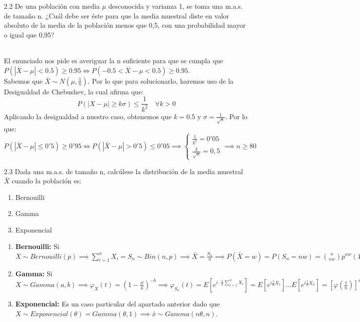 \begin{problem}{2.2}
	De una población con media $\mu$ desconocida y varianza 1, se toma una m.a.s. de tamaño n. ¿Cuál debe ser éste para que la media muestral diste en valor absoluto de la media de la población menos que 0,5, con una probabilidad mayor o igual que 0,95?
\end{problem}
\begin{sol}
	\\El enunciado nos pide es averiguar la n suficiente para que se cumpla que $P(|\bar{X}-\mu|<0.5)\geq 0.95 \iff P( -0.5 < \bar{X} - \mu < 0.5) \geq 0.95$.\\
	Sabemos que $\bar{X} \sim N(\mu, \frac{1}{n})$. Por lo que 
	para solucionarlo, haremos uso de la Desigualdad de Chebushev, la cual afirma que: $$ P(|X - \mu| \geq k\sigma) \leq \frac{1}{k^2} \quad \forall k > 0$$
	Aplicando la desigualdad a nuestro caso, obtenemos que $k = 0.5$ y $\sigma = \frac{1}{\sqrt{n}}$. Por lo que:
	$$P(|\bar{X} - \mu| \leq 0'5) \geq 0'95 \iff P(|\bar{X} - \mu| > 0'5) \leq 0'05 \implies \begin{cases} \frac{1}{k^2} = 0'05 \\ \frac{k}{\sqrt{n}} = 0,5 \end{cases} \implies n \geq 80$$
\end{sol}
\begin{problem}{2.3}
	Dada una m.a.s. de tamaño n, calcúlese la distribución de la media muestral $\bar{X}$ cuando la población es: 
	\begin{enumerate}
		\item Bernouilli
		\item Gamma
		\item Exponencial
	\end{enumerate}	
\end{problem}
\begin{sol}
	\begin{enumerate}
		\item \textbf{Bernouilli:} Si $X \sim Bernouilli(p) \implies \sum_{i = 1}^{n}X_i = S_n \sim Bin(n, p) \implies \bar{X} = \frac{S_n}{n} \implies P(\bar{X} = w) = P(S_n = nw) = \binom{n}{nw}p^{nw}(1-p)^{n(1-w)}$
		\item \textbf{Gamma:} Si $X \sim Gamma(a, b) \implies \varphi_{X}(t) = (1 - \frac{it}{a})^{-b} \implies \varphi_{S_n}(t) = E[e^{i \cdot \frac{t}{n}\sum_{i = 1}^{n}X_i}] = E[e^{i\frac{t}{n}X_1}] \ldots E[e^{i\frac{t}{n}X_n}] = \left[\varphi(\frac{t}{n})\right]^n = (1- \frac{it}{an})^{-nb} \implies \bar{X} \sim Gamma(na,nb)$
		\item \textbf{Exponencial:} Es un caso particular del apartado anterior dado que $X \sim Exponencial(\theta) = Gamma(\theta, 1) \implies \bar{x} \sim Gamma(n\theta, n)$.
	\end{enumerate}
\end{sol}
